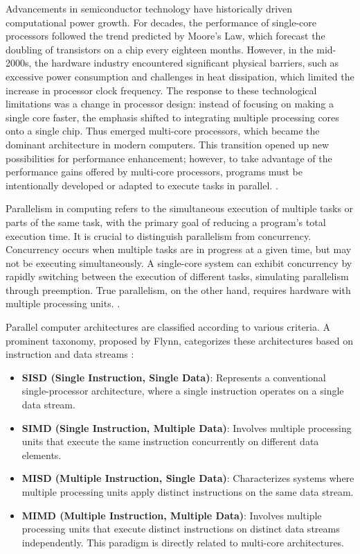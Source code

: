 

Advancements in semiconductor technology have historically driven computational power growth. For decades, the performance of single-core processors followed the trend predicted by Moore's Law, which forecast the doubling of transistors on a chip every eighteen months. However, in the mid-2000s, the hardware industry encountered significant physical barriers, such as excessive power consumption and challenges in heat dissipation, which limited the increase in processor clock frequency. The response to these technological limitations was a change in processor design: instead of focusing on making a single core faster, the emphasis shifted to integrating multiple processing cores onto a single chip. Thus emerged multi-core processors, which became the dominant architecture in modern computers. This transition opened up new possibilities for performance enhancement; however, to take advantage of the performance gains offered by multi-core processors, programs must be intentionally developed or adapted to execute tasks in parallel. \cite{Pacheco2011}.


Parallelism in computing refers to the simultaneous execution of multiple tasks or parts of the same task, with the primary goal of reducing a program's total execution time. It is crucial to distinguish parallelism from concurrency. Concurrency occurs when multiple tasks are in progress at a given time, but may not be executing simultaneously. A single-core system can exhibit concurrency by rapidly switching between the execution of different tasks, simulating parallelism through preemption. True parallelism, on the other hand, requires hardware with multiple processing units. \cite{Butenhof1997}.


Parallel computer architectures are classified according to various criteria. A prominent taxonomy, proposed by Flynn, categorizes these architectures based on instruction and data streams \cite{Flynn1966}:
\begin{itemize}
    \item \textbf{SISD (Single Instruction, Single Data)}: Represents a conventional single-processor architecture, where a single instruction operates on a single data stream.
    \item \textbf{SIMD (Single Instruction, Multiple Data)}: Involves multiple processing units that execute the same instruction concurrently on different data elements.
    \item \textbf{MISD (Multiple Instruction, Single Data)}: Characterizes systems where multiple processing units apply distinct instructions on the same data stream.
    \item \textbf{MIMD (Multiple Instruction, Multiple Data)}:  Involves multiple processing units that execute distinct instructions on distinct data streams independently. This paradigm is directly related to multi-core architectures.
\end{itemize}

